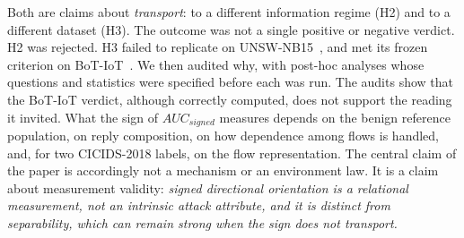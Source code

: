 \documentclass[preprint,12pt]{elsarticle}
\begin{document}
Both are claims about \emph{transport}: to a different information regime (H2) and to a different dataset (H3). The outcome was not a single positive or negative verdict. H2 was rejected. H3 failed to replicate on UNSW-NB15~\cite{moustafa2015unsw}, and met its frozen criterion on BoT-IoT~\cite{koroniotis2019botiot}. We then audited why, with post-hoc analyses whose questions and statistics were specified before each was run. The audits show that the BoT-IoT verdict, although correctly computed, does not support the reading it invited. What the sign of $AUC_{signed}$ measures depends on the benign reference population, on reply composition, on how dependence among flows is handled, and, for two CICIDS-2018 labels, on the flow representation. The central claim of the paper is accordingly not a mechanism or an environment law. It is a claim about measurement validity: \emph{signed directional orientation is a relational measurement, not an intrinsic attack attribute, and it is distinct from separability, which can remain strong when the sign does not transport.}
\end{document}
